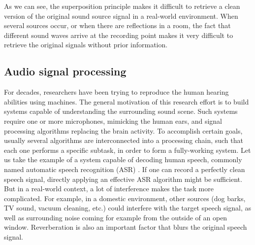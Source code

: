 As we can see, the superposition principle makes it difficult to retrieve a clean version of the original sound source signal in a real-world environment. When several sources occur, or when there are reflections in a room, the fact that different sound waves arrive at the recording point makes it very difficult to retrieve the original signals without prior information.


\subsection{Audio signal processing}

For decades, researchers have been trying to reproduce the human hearing abilities using machines. The general motivation of this research effort is to build systems capable of understanding the surrounding sound scene. Such systems require one or more microphones, mimicking the human ears, and signal processing algorithms replacing the brain activity. To accomplish certain goals, usually several algorithms are interconnected into a processing chain, such that each one performs a specific subtask, in order to form a fully-working system. Let us take the example of a system capable of decoding human speech, commonly named automatic speech recognition (ASR) \cite{nassif_speech_2019}. If one can record a perfectly clean speech signal, directly applying an effective ASR algorithm might be sufficient. But in a real-world context, a lot of interference makes the task more complicated. For example, in a domestic environment, other sources (dog barks, TV sound, vacuum cleaning, etc.) could interfere with the target speech signal, as well as surrounding noise coming for example from the outside of an open window. Reverberation is also an important factor that blurs the original speech signal.

